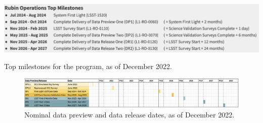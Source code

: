 \begin{table}
\label{tab:milestones}
\includegraphics[width=\linewidth]{figures/DPR-milestones}
\caption{Top milestones for the \es program, as of December 2022.}
\end{table}

\begin{figure}
\includegraphics[width=\linewidth]{figures/DPR-timeline}
\caption{Nominal data preview and data release dates, as of December 2022.}
\label{fig:timeline}
\end{figure}
